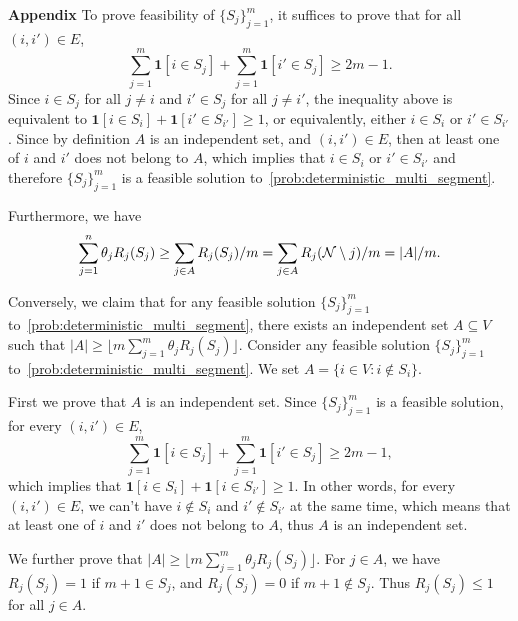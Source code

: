 \documentclass[msom,non-blindrev]{informs3} %
\theoremstyle{definition}
\begin{document}
\begin{appendices}{\Large \noindent\textbf{Appendix}}
To prove feasibility of $\{S_j\}_{j=1}^m$, it suffices to prove that for all $(i,i')\in E$,
\begin{equation*}
	\sum_{j=1}^m \bm{1}[i\in S_j]+\sum_{j=1}^m\bm{1}[i'\in S_j]\geq 2m-1.
\end{equation*}
Since $i\in S_j$ for all $j\neq i$ and $i'\in S_j$ for all $j\neq i'$, the inequality above is equivalent to \mbox{$\bm{1}[i\in S_i]+\bm{1}[i'\in S_{i'}]\geq 1$}, or equivalently, either $i\in S_i$ or $i'\in S_{i'}$. Since by definition $A$ is an independent set, and $(i,i') \in E$, then at least one of $i$ and $i'$ does not belong to $A$, which implies that $i\in S_i$ or $i'\in S_{i'}$ and therefore
$\{S_j\}_{j=1}^m$ is a feasible solution to~\eqref{prob:deterministic_multi_segment}.
		
Furthermore, we have
\begin{equation*}
	\sum_{j=1}^n\theta_j R_j(S_j)\geq \sum_{j\in A}R_j(S_j)/m=  \sum_{j\in A}R_j( {\cal N} \setminus j)/m =   |A|/m.
\end{equation*}
		
Conversely, we claim that for any feasible solution $\{S_j\}_{j=1}^m$ to~\eqref{prob:deterministic_multi_segment}, there exists an independent set $A\subseteq V$ such that $|A|\geq\lfloor m\sum_{j=1}^m \theta_jR_j(S_j)\rfloor$. Consider any feasible solution $\{S_j\}_{j=1}^m$ to~\eqref{prob:deterministic_multi_segment}. We set $A=\{i\in V:i\notin S_i\}$. %
		
First we prove that $A$ is an independent set. Since $\{S_j\}_{j=1}^m$ is a feasible solution, for every $(i,i')\in E$,
\begin{equation*}
	\sum_{j=1}^m \bm{1}[i\in S_j]+\sum_{j=1}^m \bm{1}[i'\in S_j]\geq 2m-1,
\end{equation*}
which implies that $\bm{1}[i\in S_i]+\bm{1}[i\in S_{i'}]\geq 1$. In other words, for every $(i,i')\in E$, we can't have $i \notin S_i$ and $i' \notin S_{i'}$ at the same time, which means that at least one of $i$ and $i'$ does not belong to $A$,
thus $A$ is an independent set.
		
We further prove that $|A|\geq \lfloor m\sum_{j=1}^m \theta_jR_j(S_j)\rfloor$.
For $j\in A$, we have $R_j(S_j)=1$ if $m+1\in S_j$, and $R_j(S_j)=0$ if $m+1\notin S_j$. Thus $R_j(S_j)\leq 1$ for all $j\in A$. 


\end{appendices}
\end{document}
